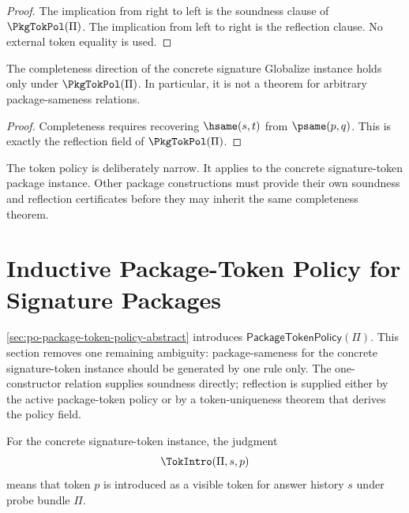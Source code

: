 \begin{proof}
The implication from right to left is the soundness clause of \(\PkgTokPol(\Pi)\). The implication from left to right is the reflection clause. No external token equality is used.
\end{proof}

\begin{corollary}
\label{cor:concrete-package-completeness-policy-grounded}
The completeness direction of the concrete signature Globalize instance holds only under \(\PkgTokPol(\Pi)\). In particular, it is not a theorem for arbitrary package-sameness relations.
\end{corollary}

\begin{proof}
Completeness requires recovering \(\hsame(s,t)\) from \(\psame(p,q)\). This is exactly the reflection field of \(\PkgTokPol(\Pi)\).
\end{proof}

\begin{remark}
The token policy is deliberately narrow. It applies to the concrete signature-token package instance. Other package constructions must provide their own soundness and reflection certificates before they may inherit the same completeness theorem.
\end{remark}

\section{Inductive Package-Token Policy for Signature Packages}
\label{sec:po-inductive-package-token-policy-instance}

\autoref{sec:po-package-token-policy-abstract} introduces \(\mathsf{PackageTokenPolicy}(\Pi)\). This section removes one remaining ambiguity: package-sameness for the concrete signature-token instance should be generated by one rule only. The one-constructor relation supplies soundness directly; reflection is supplied either by the active package-token policy or by a token-uniqueness theorem that derives the policy field.

\begin{definition}
\label{def:concrete-signature-token-introduction}
For the concrete signature-token instance, the judgment
$$
  \TokIntro(\Pi,s,p)
$$
means that token \(p\) is introduced as a visible token for answer history \(s\) under probe bundle \(\Pi\).
\end{definition}

